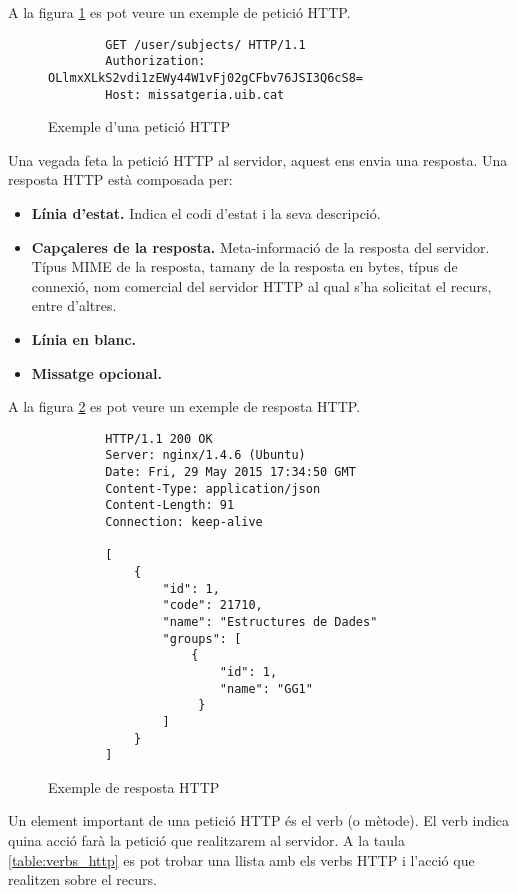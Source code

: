 A la figura \ref{fig:exemple_peticio_http} es pot veure un exemple de petició \ac{HTTP}.

\begin{figure}[here]
	\begin{verbatim}
		GET /user/subjects/ HTTP/1.1
		Authorization: OLlmxXLkS2vdi1zEWy44W1vFj02gCFbv76JSI3Q6cS8=
		Host: missatgeria.uib.cat
	\end{verbatim}
\caption{Exemple d'una petició \ac{HTTP}}
\label{fig:exemple_peticio_http}
\end{figure}

Una vegada feta la petició \ac{HTTP} al servidor, aquest ens envia una resposta. Una resposta \ac{HTTP} està composada per:

\begin{itemize}
	\item \textbf{Línia d'estat.} Indica el codi d'estat i la seva descripció.
	\item \textbf{Capçaleres de la resposta.} Meta-informació de la resposta del servidor. Típus \ac{MIME} de la resposta, tamany de la resposta en bytes, típus de connexió, nom comercial del servidor \ac{HTTP} al qual s'ha solicitat el recurs, entre d'altres.
	\item \textbf{Línia en blanc.}
	\item \textbf{Missatge opcional.}
\end{itemize}

A la figura \ref{fig:exemple_resposta_http} es pot veure un exemple de resposta \ac{HTTP}.\\

\begin{figure}[here!]
	\begin{verbatim}
		HTTP/1.1 200 OK
		Server: nginx/1.4.6 (Ubuntu)
		Date: Fri, 29 May 2015 17:34:50 GMT
		Content-Type: application/json
		Content-Length: 91
		Connection: keep-alive
		
		[
  			{
   				"id": 1,
   				"code": 21710,
   				"name": "Estructures de Dades"
    			"groups": [
      				{
        				"id": 1,
        				"name": "GG1"
     				 }
    			]
   			}
		]
  	\end{verbatim}
  	\caption{Exemple de resposta \ac{HTTP}}
  	\label{fig:exemple_resposta_http}
 \end{figure}
 
Un element important de una petició \ac{HTTP} és el verb (o mètode). El verb indica quina acció farà la petició que realitzarem al servidor. A la taula \ref{table:verbs_http} es pot trobar una llista amb els verbs \ac{HTTP} i l'acció que realitzen sobre el recurs.

